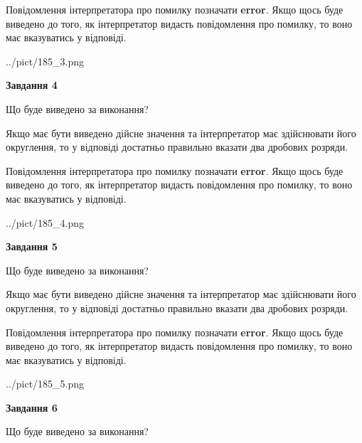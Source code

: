 \documentclass[12pt, ukrainian]{article}
\begin{document}
{\begin {Large}
Повідомлення інтерпретатора про помилку позначати \textbf{error}.
Якщо щось буде виведено до того, як інтерпретатор видасть повідомлення про помилку, 
то воно має вказуватись у відповіді. \par

\begin{center}
	{../pict/185_3.png}
\end{center}
\newpage

{\begin {center}\textbf{Завдання 4}\end {center}}\par
Що буде виведено за виконання? \par

Якщо має бути виведено дійсне значення та інтерпретатор має здійснювати його округлення, 
то у відповіді достатньо правильно вказати два дробових розряди.

Повідомлення інтерпретатора про помилку позначати \textbf{error}.
Якщо щось буде виведено до того, як інтерпретатор видасть повідомлення про помилку, 
то воно має вказуватись у відповіді. \par

\begin{center}
	{../pict/185_4.png}
\end{center}
\newpage

{\begin {center}\textbf{Завдання 5}\end {center}}\par
Що буде виведено за виконання? \par

Якщо має бути виведено дійсне значення та інтерпретатор має здійснювати його округлення, 
то у відповіді достатньо правильно вказати два дробових розряди.

Повідомлення інтерпретатора про помилку позначати \textbf{error}.
Якщо щось буде виведено до того, як інтерпретатор видасть повідомлення про помилку, 
то воно має вказуватись у відповіді. \par

\begin{center}
	{../pict/185_5.png}
\end{center}
\newpage

{\begin {center}\textbf{Завдання 6}\end {center}}\par
Що буде виведено за виконання? \par


\end{Large}}
\end{document}
